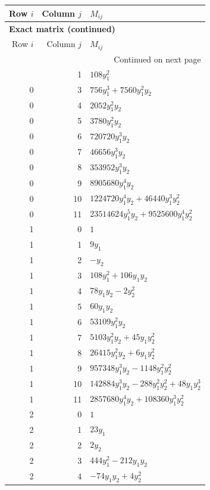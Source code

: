 \documentclass[10pt,a4paper]{article}
\begin{document}
{\small\setlength{\tabcolsep}{7pt}\begin{longtable}{rrp{125mm}}
\toprule Row $i$ & Column $j$ & $M_{ij}$\\\midrule\endfirsthead
\multicolumn{3}{l}{\textbf{Exact matrix (continued)}}\\
\toprule Row $i$ & Column $j$ & $M_{ij}$\\\midrule\endhead
\midrule\multicolumn{3}{r}{Continued on next page}\\\endfoot\bottomrule\endlastfoot
0 & 1 & $108 y_{1}^{2}$\\
0 & 3 & $756 y_{1}^{3} + 7560 y_{1}^{2} y_{2}$\\
0 & 4 & $2052 y_{1}^{2} y_{2}$\\
0 & 5 & $3780 y_{1}^{2} y_{2}$\\
0 & 6 & $720720 y_{1}^{3} y_{2}$\\
0 & 7 & $46656 y_{1}^{3} y_{2}$\\
0 & 8 & $353952 y_{1}^{3} y_{2}$\\
0 & 9 & $8905680 y_{1}^{4} y_{2}$\\
0 & 10 & $1224720 y_{1}^{4} y_{2} + 46440 y_{1}^{3} y_{2}^{2}$\\
0 & 11 & $23514624 y_{1}^{5} y_{2} + 9525600 y_{1}^{4} y_{2}^{2}$\\
1 & 0 & $1$\\
1 & 1 & $9 y_{1}$\\
1 & 2 & $- y_{2}$\\
1 & 3 & $108 y_{1}^{2} + 106 y_{1} y_{2}$\\
1 & 4 & $78 y_{1} y_{2} - 2 y_{2}^{2}$\\
1 & 5 & $60 y_{1} y_{2}$\\
1 & 6 & $53109 y_{1}^{2} y_{2}$\\
1 & 7 & $5103 y_{1}^{2} y_{2} + 45 y_{1} y_{2}^{2}$\\
1 & 8 & $26415 y_{1}^{2} y_{2} + 6 y_{1} y_{2}^{2}$\\
1 & 9 & $957348 y_{1}^{3} y_{2} - 1148 y_{1}^{2} y_{2}^{2}$\\
1 & 10 & $142884 y_{1}^{3} y_{2} - 288 y_{1}^{2} y_{2}^{2} + 48 y_{1} y_{2}^{3}$\\
1 & 11 & $2857680 y_{1}^{4} y_{2} + 108360 y_{1}^{3} y_{2}^{2}$\\
2 & 0 & $1$\\
2 & 1 & $23 y_{1}$\\
2 & 2 & $2 y_{2}$\\
2 & 3 & $444 y_{1}^{2} - 212 y_{1} y_{2}$\\
2 & 4 & $- 74 y_{1} y_{2} + 4 y_{2}^{2}$\\

\end{longtable}}
\end{document}
